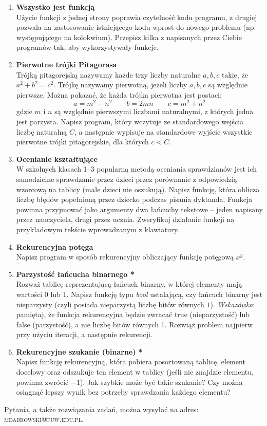 \documentclass[12pt]{article}
\begin{document}
\begin{enumerate}
\newpage
{}

\item \textbf{Wszystko jest funkcją}\\
Użycie funkcji z jednej strony poprawia czytelność kodu programu, z drugiej pozwala na zastosowanie istniejącego kodu wprost do nowego problemu (np. występującego na kolokwium). Przepisz kilka z napisanych przez Ciebie programów tak, aby wykorzystywały funkcje.

\item \textbf{Pierwotne trójki Pitagorasa}\\
Trójką pitagorejską nazywamy każde trzy liczby naturalne $a,b,c$ takie, że $a^2+b^2=c^2$. Trójkę nazywamy pierwotną, jeżeli liczby $a,b,c$ są względnie pierwsze. Można pokazać, że każda trójka pierwotna jest postaci:
\[
a=m^2-n^2 \quad \quad b=2mn \quad \quad c=m^2+n^2
\]
gdzie $m$ i $n$ są względnie pierwszymi liczbami naturalnymi, z których jedna jest parzysta. Napisz program, który wczytuje ze standardowego wejścia liczbę naturalną $C$, a następnie wypisuje na standardowe wyjście wszystkie pierwotne trójki pitagorejskie, dla których $c<C$.

\item \textbf{Ocenianie kształtujące}\\
W szkolnych klasach 1--3 popularną metodą oceniania sprawdzianów jest ich samodzielne sprawdzanie przez dzieci przez porównanie z odpowiedzią wzorcową na tablicy (małe dzieci nie oszukują). Napisz funkcję, która oblicza liczbę błędów popełnioną przez dziecko podczas pisania dyktanda. Funkcja powinna przyjmować jako argumenty dwa łańcuchy tekstowe -- jeden napisany przez nauczyciela, drugi przez ucznia. Zweryfikuj działanie funkcji na przykładowym tekście wprowadzanym z klawiatury.

\item \textbf{Rekurencyjna potęga}\\
Napisz program w sposób rekurencyjny obliczający funkcję potęgową $x^y$.

\item \textbf{Parzystość łańcucha binarnego *}\\
Rozważ tablicę reprezentującą łańcuch binarny, w której elementy mają wartości $0$ lub $1$. Napisz funkcję typu \textit{bool} ustalającą, czy łańcuch binarny jest nieparzysty (czyli posiada nieparzystą liczbę bitów równych $1$). \textit{Wskazówka}: pamiętaj, że funkcja rekurencyjna będzie zwracać true (nieparzystość) lub false (parzystość), a nie liczbę bitów równych 1. Rozwiąż problem najpierw przy użyciu iteracji, a następnie rekurencji.

\item \textbf{Rekurencyjne szukanie (binarne) *}\\
Napisz funkcję rekurencyjną, która pobiera posortowaną tablicę, element docelowy oraz odszukuje ten element w tablicy (jeśli nie znajdzie elementu, powinna zwrócić $-1$). Jak szybkie może być takie szukanie? Czy można osiągnąć lepszy wynik bez potrzeby sprawdzania każdego elementu?

\end{enumerate}
\vspace{1cm}
\small Pytania, a także rozwiązania zadań, można wysyłać na adres: \textsc{mdabrowski@fuw.edu.pl}.
\end{document}
